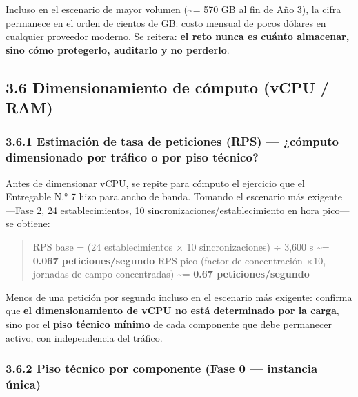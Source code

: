 \documentclass[11pt,a4paper]{article}
\begin{document}
Incluso en el escenario de mayor volumen (\textasciitilde= 570 GB al fin de Año 3), la cifra permanece en el orden de cientos de GB: costo mensual de pocos dólares en cualquier proveedor moderno. Se reitera: \textbf{el reto nunca es cuánto almacenar, sino cómo protegerlo, auditarlo y no perderlo}.

\subsection{3.6 Dimensionamiento de cómputo (vCPU / RAM)}\label{dimensionamiento-de-cuxf3mputo-vcpu-ram}

\subsubsection{3.6.1 Estimación de tasa de peticiones (RPS) --- ¿cómputo dimensionado por tráfico o por piso técnico?}\label{estimaciuxf3n-de-tasa-de-peticiones-rps-cuxf3mputo-dimensionado-por-truxe1fico-o-por-piso-tuxe9cnico}

Antes de dimensionar vCPU, se repite para cómputo el ejercicio que el Entregable N.° 7 hizo para ancho de banda. Tomando el escenario más exigente ---Fase 2, 24 establecimientos, 10 sincronizaciones/establecimiento en hora pico--- se obtiene:

\begin{quote}
RPS base = (24 establecimientos × 10 sincronizaciones) ÷ 3,600 s \textasciitilde= \textbf{0.067 peticiones/segundo}
RPS pico (factor de concentración ×10, jornadas de campo concentradas) \textasciitilde= \textbf{0.67 peticiones/segundo}
\end{quote}

Menos de una petición por segundo incluso en el escenario más exigente: confirma que \textbf{el dimensionamiento de vCPU no está determinado por la carga}, sino por el \textbf{piso técnico mínimo} de cada componente que debe permanecer activo, con independencia del tráfico.

\subsubsection{3.6.2 Piso técnico por componente (Fase 0 --- instancia única)}\label{piso-tuxe9cnico-por-componente-fase-0-instancia-uxfanica}
\end{document}
